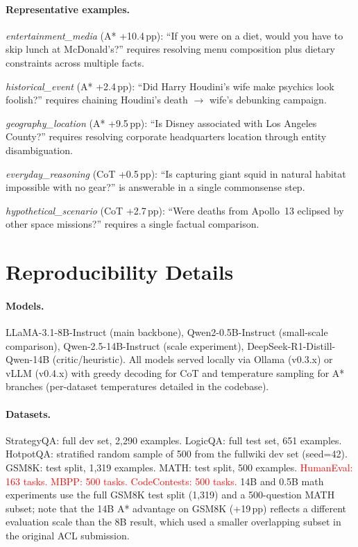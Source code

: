 \documentclass[10pt]{article}
\begin{document}
\paragraph{Representative examples.}
\emph{entertainment\_media} (A* +10.4\,pp): ``If you were on a diet, would you have to skip lunch at McDonald's?'' requires resolving menu composition plus dietary constraints across multiple facts.

\emph{historical\_event} (A* +2.4\,pp): ``Did Harry Houdini's wife make psychics look foolish?'' requires chaining Houdini's death $\to$ wife's debunking campaign.

\emph{geography\_location} (A* +9.5\,pp): ``Is Disney associated with Los Angeles County?'' requires resolving corporate headquarters location through entity disambiguation.

\emph{everyday\_reasoning} (CoT +0.5\,pp): ``Is capturing giant squid in natural habitat impossible with no gear?'' is answerable in a single commonsense step.

\emph{hypothetical\_scenario} (CoT +2.7\,pp): ``Were deaths from Apollo~13 eclipsed by other space missions?'' requires a single factual comparison.

\section{Reproducibility Details}
\label{app:reproducibility}

\paragraph{Models.} LLaMA-3.1-8B-Instruct (main backbone), Qwen2-0.5B-Instruct (small-scale comparison), Qwen-2.5-14B-Instruct (scale experiment), DeepSeek-R1-Distill-Qwen-14B (critic/heuristic). All models served locally via Ollama (v0.3.x) or vLLM (v0.4.x) with greedy decoding for CoT and temperature sampling for A* branches (per-dataset temperatures detailed in the codebase).

\paragraph{Datasets.} StrategyQA: full dev set, 2{,}290 examples. LogicQA: full test set, 651 examples. HotpotQA: stratified random sample of 500 from the fullwiki dev set (seed=42). GSM8K: test split, 1{,}319 examples. MATH: test split, 500 examples. \textcolor{red}{HumanEval: 163 tasks. MBPP: 500 tasks. CodeContests: 500 tasks.} 14B and 0.5B math experiments use the full GSM8K test split (1{,}319) and a 500-question MATH subset; note that the 14B A* advantage on GSM8K (+19\,pp) reflects a different evaluation scale than the 8B result, which used a smaller overlapping subset in the original ACL submission.
\end{document}
